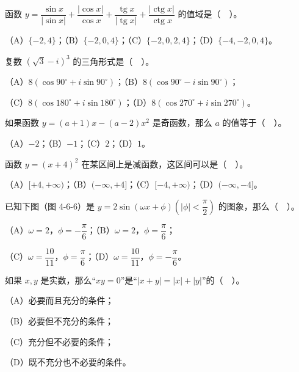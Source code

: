 \begin{question}
函数 $y=\dfrac{\sin x}{|\sin x|}+\dfrac{|\cos x|}{\cos x}+\dfrac{\operatorname{tg}x}{|\operatorname{tg}x|}+\dfrac{|\operatorname{ctg}x|}{\operatorname{ctg}x}$ 的值域是（　）。

（A）$\{-2,4\}$；（B）$\{-2,0,4\}$；（C）$\{-2,0,2,4\}$；（D）$\{-4,-2,0,4\}$。

\end{question}
\begin{question}
复数 $(\sqrt3-i)^3$ 的三角形式是（　）。

（A）$8(\cos 90^\circ+i\sin 90^\circ)$；（B）$8(\cos 90^\circ-i\sin 90^\circ)$；

（C）$8(\cos 180^\circ+i\sin 180^\circ)$；（D）$8(\cos 270^\circ+i\sin 270^\circ)$。

\end{question}
\begin{question}
如果函数 $y=(a+1)x-(a-2)x^2$ 是奇函数，那么 $a$ 的值等于（　）。

（A）$-2$；（B）$-1$；（C）$2$；（D）$1$。

\end{question}
\begin{question}
函数 $y=(x+4)^2$ 在某区间上是减函数，这区间可以是（　）。

（A）$[+4,+\infty)$；（B）$(-\infty,+4]$；（C）$[-4,+\infty)$；（D）$(-\infty,-4]$。

\Needspace{0.4\textheight}
\end{question}
\begin{question}
已知下图（图 4-6-6）是 $y=2\sin(\omega x+\phi)\left(|\phi|<\dfrac{\pi}{2}\right)$ 的图象，那么（　）。

（A）$\omega=2$，$\phi=-\dfrac{\pi}{6}$；（B）$\omega=2$，$\phi=\dfrac{\pi}{6}$；

（C）$\omega=\dfrac{10}{11}$，$\phi=\dfrac{\pi}{6}$；（D）$\omega=\dfrac{10}{11}$，$\phi=-\dfrac{\pi}{6}$。
\nopagebreak[4]
\begin{center}\end{center}
\nopagebreak[4]
\end{question}
\begin{question}
如果 $x,y$ 是实数，那么“$xy=0$”是“$|x+y|=|x|+|y|$”的（　）。

（A）必要而且充分的条件；

（B）必要但不充分的条件；

（C）充分但不必要的条件；

（D）既不充分也不必要的条件。

\end{question}
